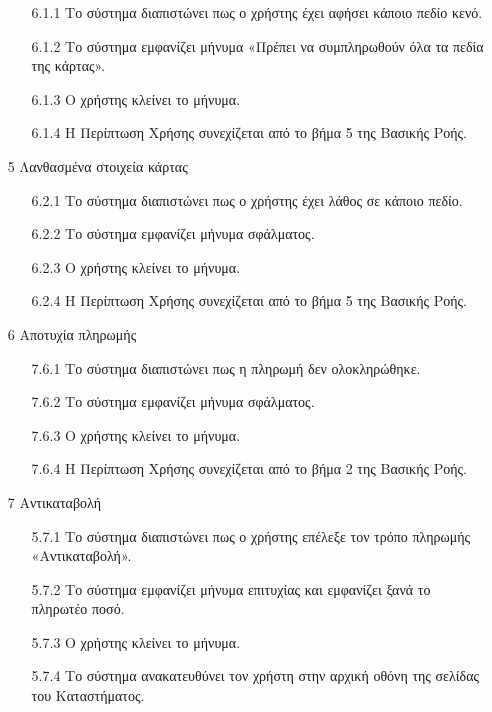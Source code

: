 \documentclass[12pt,a4paper,twoside]{book}
\begin{document}
\begin{enumerate}
\begin{enumerate}
          \item[6.1.1 ] Το σύστημα διαπιστώνει πως ο χρήστης έχει αφήσει κάποιο πεδίο κενό. %
          \item[6.1.2 ] Το σύστημα εμφανίζει μήνυμα «Πρέπει να συμπληρωθούν όλα τα πεδία της κάρτας». %
          \item[6.1.3 ] Ο χρήστης κλείνει το μήνυμα. %
          \item[6.1.4 ] Η Περίπτωση Χρήσης συνεχίζεται από το βήμα 5 της Βασικής Ροής. %
        \end{enumerate}
  \item[5 ] Λανθασμένα στοιχεία κάρτας %
        \begin{enumerate}
          \item[6.2.1 ] Το σύστημα διαπιστώνει πως ο χρήστης έχει λάθος σε κάποιο πεδίο. %
          \item[6.2.2 ] Το σύστημα εμφανίζει μήνυμα σφάλματος. %
          \item[6.2.3 ] Ο χρήστης κλείνει το μήνυμα. %
          \item[6.2.4 ] Η Περίπτωση Χρήσης συνεχίζεται από το βήμα 5 της Βασικής Ροής. %
        \end{enumerate}
  \item[6 ] Αποτυχία πληρωμής %
        \begin{enumerate}
          \item[7.6.1 ] Το σύστημα διαπιστώνει πως η πληρωμή δεν ολοκληρώθηκε. %
          \item[7.6.2 ] Το σύστημα εμφανίζει μήνυμα σφάλματος. %
          \item[7.6.3 ] Ο χρήστης κλείνει το μήνυμα. %
          \item[7.6.4 ] Η Περίπτωση Χρήσης συνεχίζεται από το βήμα 2 της Βασικής Ροής. %
        \end{enumerate}
  \item[7 ] Αντικαταβολή %
        \begin{enumerate}
          \item[5.7.1 ] Το σύστημα διαπιστώνει πως ο χρήστης επέλεξε τον τρόπο πληρωμής «Αντικαταβολή». %
          \item[5.7.2 ] Το σύστημα εμφανίζει μήνυμα επιτυχίας και εμφανίζει ξανά το πληρωτέο ποσό. %
          \item[5.7.3 ] Ο χρήστης κλείνει το μήνυμα. %
          \item[5.7.4 ] Το σύστημα ανακατευθύνει τον χρήστη στην αρχική οθόνη της σελίδας του Καταστήματος. %

\end{enumerate}
\end{enumerate}
\end{document}
